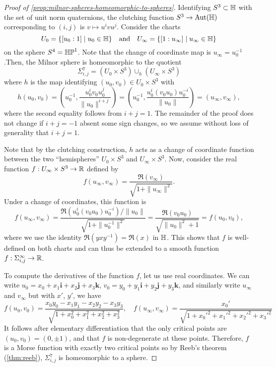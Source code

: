 \begin{proof}[Proof of \cref{prop:milnor-spheres-homeomorphic-to-spheres}]
	Identifying $S^3\subset \mathbb{H}$ with the set of unit norm quaternions, the clutching function $S^3 \to \operatorname{Aut}(\mathbb{H})$ corresponding to $(i,j)$ is $v\mapsto u^ivu^j$. Consider the charts
	\[
		U_0 = \{ [u_0:1] \mid u_0\in \mathbb{H}\}\quad\textrm{and}\quad U_\infty = \{ [1:u_\infty] \mid u_\infty\in \mathbb{H}\}
	\]
	on the sphere $S^4=\mathbb{HP}^1$. Note that the change of coordinate map is $u_\infty=u_0^{-1}$.Then, the Milnor sphere is homeomorphic to the quotient
	\[
		\Sigma^7_{i,j} = (U_0 \times S^3)\cup_h (U_\infty\times S^3)
	\]
	where $h$ is the map identifying $(u_0,v_0)\in U_0\times S^3$ with
	\[
		h(u_0,v_0)= \left(u_0^{-1}, \frac{u_0^iv_0u_0^j}{\|u_0\|^{i+j}}\right) = \left(u_0^{-1}, \frac{u_0^i (v_0u_0) u_0^{-i}}{\|u_0\|}\right) = (u_\infty, v_\infty),
	\]
	where the second equality follows from $i+j=1$. The remainder of the proof does not change if $i+j=-1$ absent some sign changes, so we assume without loss of generality that $i+j=1$.

	Note that by the clutching construction, $h$ acts as a change of coordinate function between the two ``hemispheres'' $U_0\times S^3$ and $U_\infty\times S^3$.
	Now, consider the real function $f : U_\infty\times S^3\to \mathbb{R}$ defined by
	\[
		f(u_\infty, v_\infty) = \frac{\Re(v_\infty)}{\sqrt{1+\|u_\infty\|^2}}.
	\]
	Under a change of coordinates, this function is
	\[
		f(u_\infty, v_\infty) = \frac{\Re(u_0^i(v_0u_0)u_0^{-i})/\|u_0\|}{\sqrt{1+\|u_0^{-1}\|^2}} = \frac{\Re(v_0u_0)}{\sqrt{\|u_0\|^2+1}}=f(u_0,v_0),
	\]
	where we use the identity $\Re(yxy^{-1})=\Re(x)$ in $\mathbb{H}$. This shows that $f$ is well-defined on both charts and can thus be extended to a smooth function $f : \Sigma^\infty_{i,j} \to \mathbb{R}$.

	To compute the derivatives of the function $f$, let us use real coordinates. We can write $u_0=x_0+x_1\bm{i}+x_2\bm{j}+x_3\bm{k}$, $v_0 = y_0+y_1\bm{i}+y_2\bm{j}+y_3\bm{k}$, and similarly write $u_\infty$ and $v_\infty$ but with $x'$, $y'$, we have
	\[
		f(u_0, v_0) = \frac{x_0y_0 - x_1y_1 - x_2y_2 - x_3y_3}{\sqrt{1+x_0^2+x_1^2+x_2^2+x_3^2}},\quad
		f(u_\infty, v_\infty) = \frac{x_0'}{\sqrt{1+x_0'^2+x_1'^2+x_2'^2+x_3'^2}}
	\]
	It follows after elementary differentiation that the only critical points are $(u_0, v_0)= (0,\pm 1)$, and that $f$ is non-degenerate at these points. Therefore, $f$ is a Morse function with exactly two critical points so by Reeb's theorem (\ref{thm:reeb}), $\Sigma_{i,j}^7$ is homeomorphic to a sphere.
\end{proof}

